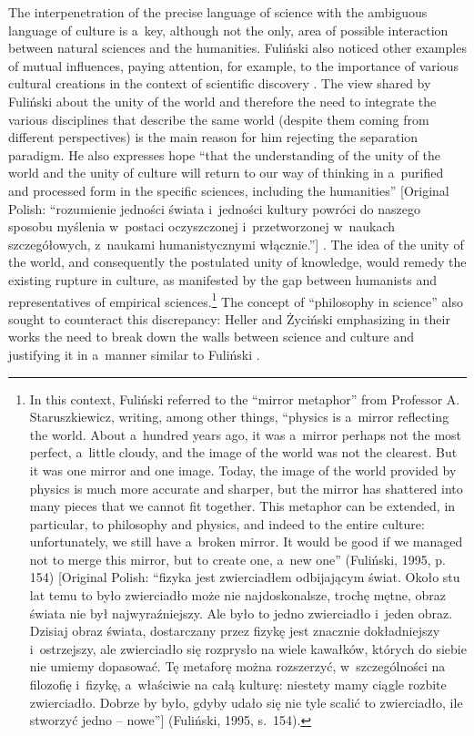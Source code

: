 The interpenetration of the precise language of science with the ambiguous language of culture is a~key, although not the only, area of possible interaction between natural sciences and the humanities. Fuliński also noticed other examples of mutual influences, paying attention, for example, to the importance of various cultural creations in the context of scientific discovery 
\parencite[][p.15]{janik_fizyka_1981}. %
 The view shared by Fuliński about the unity of the world and therefore the need to integrate the various disciplines that describe the same world (despite them coming from different perspectives) is the main reason for him rejecting the separation paradigm. He also expresses hope ``that the understanding of the unity of the world and the unity of culture will return to our way of thinking in a~purified and processed form in the specific sciences, including the humanities'' [Original Polish: ``rozumienie jedności świata i~jedności kultury powróci do naszego sposobu myślenia w~postaci oczyszczonej i~przetworzonej w~naukach szczegółowych, z~naukami humanistycznymi włącznie.''] 
\parencite[][p.28]{janik_fizyka_1981}. %
 The idea of the unity of the world, and consequently the postulated unity of knowledge, would remedy the existing rupture in culture, as manifested by the gap between humanists and representatives of empirical sciences.\footnote{In this context, Fuliński referred to the ``mirror metaphor'' from Professor A. Staruszkiewicz, writing, among other things, ``physics is a~mirror reflecting the world. About a~hundred years ago, it was a~mirror perhaps not the most perfect, a~little cloudy, and the image of the world was not the clearest. But it was one mirror and one image. Today, the image of the world provided by physics is much more accurate and sharper, but the mirror has shattered into many pieces that we cannot fit together. This metaphor can be extended, in particular, to philosophy and physics, and indeed to the entire culture: unfortunately, we still have a~broken mirror. It would be good if we managed not to merge this mirror, but to create one, a~new one'' (Fuliński, 1995, p. 154) [Original Polish: ``fizyka jest zwierciadłem odbijającym świat. Około stu lat temu to było zwierciadło może nie najdoskonalsze, trochę mętne, obraz świata nie był najwyraźniejszy. Ale było to jedno zwierciadło i~jeden obraz. Dzisiaj obraz świata, dostarczany przez fizykę jest znacznie dokładniejszy i~ostrzejszy, ale zwierciadło się rozprysło na wiele kawałków, których do siebie nie umiemy dopasować. Tę metaforę można rozszerzyć, w~szczególności na filozofię i~fizykę, a~właściwie na całą kulturę: niestety mamy ciągle rozbite zwierciadło. Dobrze by było, gdyby udało się nie tyle scalić to zwierciadło, ile stworzyć jedno -- nowe''] (Fuliński, 1995, s.~154).} The concept of ``philosophy in science'' also sought to counteract this discrepancy: Heller and Życiński emphasizing in their works the need to break down the walls between science and culture and justifying it in a~manner similar to Fuliński 
\parencites[][]{zycinski_trzy_1990}[][]{heller_czy_1998}.%




